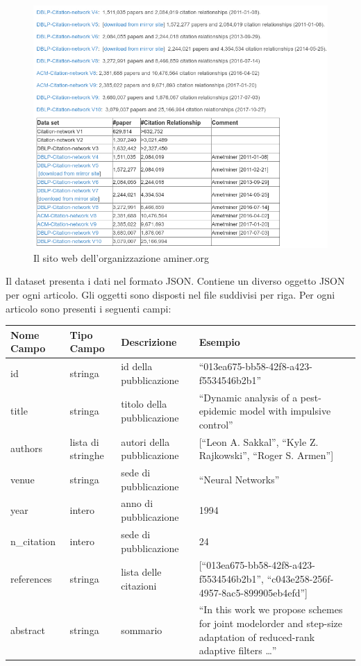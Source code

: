 \documentclass[a4paper, 12pt]{article}
\begin{document}
\begin{figure}[h!]
  \includegraphics[width=\linewidth]{images/aminer.jpg}
  \caption{Il sito web dell'organizzazione aminer.org}
\end{figure}

Il dataset presenta i dati nel formato JSON. Contiene un diverso oggetto JSON per ogni articolo. Gli oggetti sono disposti nel file suddivisi per riga.
Per ogni articolo sono presenti i seguenti campi: \\
\begin{tabularx}{\textwidth}{| X | X | X | X |}
\hline \textbf{Nome Campo} & \textbf{Tipo Campo} & \textbf{Descrizione} & \textbf{Esempio} \\
\hline id & stringa & id della pubblicazione & ``013ea675-bb58-42f8-a423-f5534546b2b1''\\
\hline title & stringa & titolo della pubblicazione & ``Dynamic analysis of a pest-epidemic model with impulsive control'' \\
\hline authors & lista di stringhe & autori della pubblicazione & [``Leon A. Sakkal'', ``Kyle Z. Rajkowski'', ``Roger S. Armen'']\\
\hline venue & stringa & sede di pubblicazione & ``Neural Networks'' \\
\hline year & intero & anno di pubblicazione & 1994 \\
\hline n\_citation & intero & sede di pubblicazione & 24 \\
\hline references & stringa & lista delle citazioni & [``013ea675-bb58-42f8-a423-f5534546b2b1'', ``c043e258-256f-4957-8ac5-899905eb4efd'']\\
\hline abstract & stringa & sommario & ``In this work we propose schemes for joint modelorder and step-size adaptation of reduced-rank adaptive filters \ldots''\\
\hline
\end{tabularx}
\end{document}
